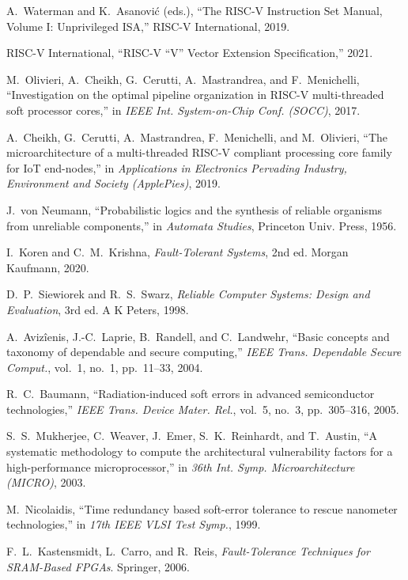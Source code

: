 A.~Waterman and K.~Asanovi\'c (eds.),
``The RISC-V Instruction Set Manual, Volume I: Unprivileged ISA,''
RISC-V International, 2019.

RISC-V International,
``RISC-V ``V'' Vector Extension Specification,'' 2021.

M.~Olivieri, A.~Cheikh, G.~Cerutti, A.~Mastrandrea, and F.~Menichelli,
``Investigation on the optimal pipeline organization in RISC-V multi-threaded
soft processor cores,'' in \emph{IEEE Int. System-on-Chip Conf. (SOCC)}, 2017.

A.~Cheikh, G.~Cerutti, A.~Mastrandrea, F.~Menichelli, and M.~Olivieri,
``The microarchitecture of a multi-threaded RISC-V compliant processing core
family for IoT end-nodes,'' in \emph{Applications in Electronics Pervading
Industry, Environment and Society (ApplePies)}, 2019.

J.~von Neumann,
``Probabilistic logics and the synthesis of reliable organisms from unreliable
components,'' in \emph{Automata Studies}, Princeton Univ. Press, 1956.

I.~Koren and C.~M.~Krishna,
\emph{Fault-Tolerant Systems}, 2nd ed. Morgan Kaufmann, 2020.

D.~P.~Siewiorek and R.~S.~Swarz,
\emph{Reliable Computer Systems: Design and Evaluation}, 3rd ed. A K Peters, 1998.

A.~Aviz\^ienis, J.-C.~Laprie, B.~Randell, and C.~Landwehr,
``Basic concepts and taxonomy of dependable and secure computing,''
\emph{IEEE Trans. Dependable Secure Comput.}, vol.~1, no.~1, pp.~11--33, 2004.

R.~C.~Baumann,
``Radiation-induced soft errors in advanced semiconductor technologies,''
\emph{IEEE Trans. Device Mater. Rel.}, vol.~5, no.~3, pp.~305--316, 2005.

S.~S.~Mukherjee, C.~Weaver, J.~Emer, S.~K.~Reinhardt, and T.~Austin,
``A systematic methodology to compute the architectural vulnerability factors
for a high-performance microprocessor,'' in \emph{36th Int. Symp.
Microarchitecture (MICRO)}, 2003.

M.~Nicolaidis,
``Time redundancy based soft-error tolerance to rescue nanometer technologies,''
in \emph{17th IEEE VLSI Test Symp.}, 1999.

F.~L.~Kastensmidt, L.~Carro, and R.~Reis,
\emph{Fault-Tolerance Techniques for SRAM-Based FPGAs}. Springer, 2006.

